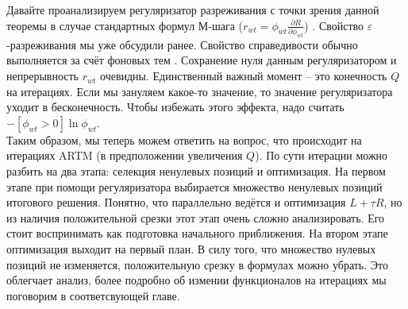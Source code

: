 \documentclass[12pt]{article}
\begin{document}
Давайте проанализируем регуляризатор разреживания с точки зрения данной теоремы в случае стандартных формул М-шага ($r_{wt} = \phi_{wt}\frac{\partial{R}}{\partial{\phi_{wt}}}$) . Свойство $\varepsilon$-разреживания мы уже обсудили ранее. Свойство справедивости обычно выполняется за счёт фоновых тем \cite{artmdef2} . Сохранение нуля данным регуляризатором и непрерывность $r_{wt}$ очевидны. Единственный важный момент -- это конечность $Q$ на итерациях. Если мы зануляем какое-то значение, то значение регуляризатора уходит в бесконечность. Чтобы избежать этого эффекта, надо считать $- [\phi_{wt} > 0] \ln\phi_{wt}$.\\
Таким образом, мы теперь можем ответить на вопрос, что происходит на итерациях ARTM (в предположении увеличения $Q$). По сути итерации можно разбить на два этапа: селекция ненулевых позиций и оптимизация. На первом этапе при помощи регуляризатора выбирается множество ненулевых позиций итогового решения. Понятно, что параллельно ведётся и оптимизация $L + \tau R$, но из наличия положительной срезки этот этап очень сложно анализировать. Его стоит воспринимать как подготовка начального приближения. На втором этапе оптимизация выходит на первый план. В силу того, что множество нулевых позиций не изменяется, положительную срезку в формулах можно убрать. Это облегчает анализ, более подробно об измении функционалов на итерациях мы поговорим в соответсвующей главе.
\end{document}
